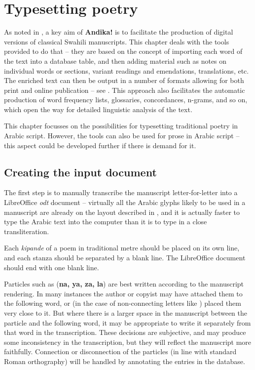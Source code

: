 \chapter{Typesetting poetry}
\label{ch:poetry}

As noted in , a key aim of \textbf{Andika!} is to facilitate the production of digital versions of classical Swahili manuscripts.  This chapter deals with the tools provided to do that -- they are based on the concept of importing each word of the text into a database table, and then adding material such as notes on individual words or sections, variant readings and emendations, translations, etc.  The enriched text can then be output in a number of formats allowing for both print and online publication -- see .  This approach also facilitates the automatic production of word frequency lists, glossaries, concordances, n-grams, and so on, which open the way for detailed linguistic analysis of the text.

This chapter focusses on the possibilities for typesetting traditional poetry in Arabic script.  However, the tools can also be used for prose in Arabic script -- this aspect could be developed further if there is demand for it.


\section{Creating the input document}

The first step is to manually transcribe the manuscript letter-for-letter into a LibreOffice \textit{odt} document -- virtually all the Arabic glyphs likely to be used in a manuscript are already on the layout described in , and it is actually faster to type the Arabic text into the computer than it is to type in a close transliteration. 

Each \textit{kipande} of a poem in traditional metre should be placed on its own line, and each stanza should be separated by a blank line. The LibreOffice document should end with one blank line.

Particles such as   (\textbf{na, ya, za, la}) are best written according to the manuscript rendering. In many instances the author or copyist may have attached them to the following word, or (in the case of non-connecting letters like ) placed them very close to it. But where there is a larger space in the manuscript between the particle and the following word, it may be appropriate to write it separately from that word in the transcription. These decisions are subjective, and may produce some inconsistency in the transcription, but they will reflect the manuscript more faithfully.  Connection or disconnection of the particles (in line with standard Roman orthography) will be handled by annotating the entries in the database.

